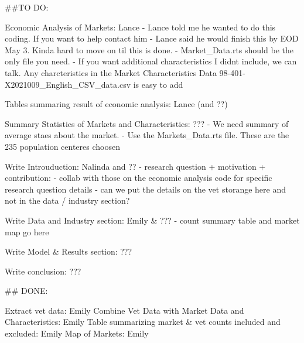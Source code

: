 ##TO DO:

Economic Analysis of Markets: Lance  
    - Lance told me he wanted to do this coding. If you want to help contact him  
    - Lance said he would finish this by EOD May 3. Kinda hard to move on til this is done.   
    - Market_Data.rts should be the only file you need. 
    - If you want additional characteristics I didnt include, we can talk. Any charcteristics in the Market Characteristics Data 98-401-X2021009_English_CSV_data.csv is easy to add

Tables summaring result of economic analysis: Lance (and ??)

Summary Statistics of Markets and Characteristics: ???
    - We need summary of average staes about the market. 
    - Use the Markets_Data.rts file. These are the 235 population centeres choosen

Write Introuduction: Nalinda and ??
    - research question + motivation + contribution: 
    - collab with those on the economic analysis code for specific research question details 
    - can we put the details on the vet storange here and not in the data / industry section? 

Write Data and Industry section: Emily & ???
    - count summary table and market map go here 

Write Model & Results section: ???

Write conclusion:  ???

## DONE: 

Extract vet data: Emily 
Combine Vet Data with Market Data and Characteristics: Emily 
Table summarizing market & vet counts included and excluded: Emily
Map of Markets: Emily 
